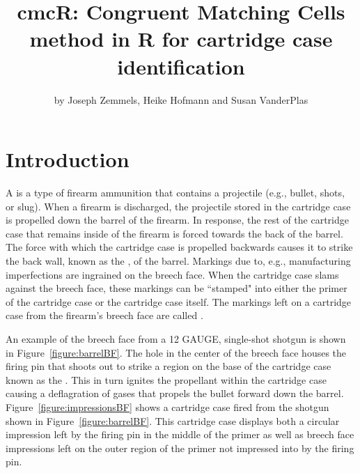 \title{cmcR: Congruent Matching Cells method in R for cartridge case identification}
\author{by Joseph Zemmels, Heike Hofmann and Susan VanderPlas}

\maketitle


\section{Introduction} \label{intro}

A  is a type of firearm ammunition that contains a projectile (e.g., bullet, shots, or slug). When a firearm is discharged, the projectile stored in the cartridge case is propelled down the barrel of the firearm. In response, the rest of the cartridge case that remains inside of the firearm is forced towards the back of the barrel. The force with which the cartridge case is propelled backwards causes it to strike the back wall, known as the , of the barrel. Markings due to, e.g., manufacturing imperfections are ingrained on the breech face. When the cartridge case slams against the breech face, these markings can be ``stamped" into either the primer of the cartridge case or the cartridge case itself. The markings left on a cartridge case from the firearm's breech face are called .

An example of the breech face from a 12 GAUGE, single-shot shotgun is shown in Figure~\ref{figure:barrelBF}. The hole in the center of the breech face houses the firing pin that shoots out to strike a region on the base of the cartridge case known as the . This in turn ignites the propellant within the cartridge case causing a deflagration of gases that propels the bullet forward down the barrel. Figure~\ref{figure:impressionsBF} shows a cartridge case fired from the shotgun shown in Figure~\ref{figure:barrelBF}. This cartridge case displays both a circular impression left by the firing pin in the middle of the primer as well as breech face impressions left on the outer region of the primer not impressed into by the firing pin.


